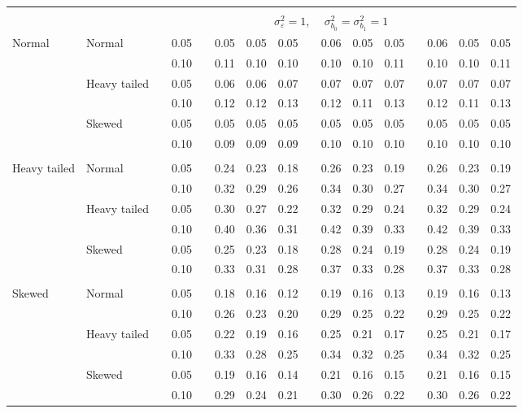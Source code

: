 \documentclass{article} %
\begin{document}
\begin{table}[ht]
\begin{scriptsize}
\begin{center}
\begin{tabular}{ll p{.1cm} c p{.1cm} rrr p{.1cm} rrr p{.1cm} rrr}
&&&&&&&&&&&&&&&\\
& && && \multicolumn{9}{c}{$\sigma_{\varepsilon}^2 = 1$, \ \ $\sigma_{b_0}^2 = \sigma_{b_1}^2 = 1$} \\ \cline{6-16}
\rowcolor{gray!20}Normal       & Normal       && 0.05 &&   0.05 & 0.05 & 0.05 && 0.06 & 0.05 & 0.05 && 0.06 & 0.05 & 0.05 \\ 
\rowcolor{gray!20}             &              && 0.10 &&   0.11 & 0.10 & 0.10 && 0.10 & 0.10 & 0.11 && 0.10 & 0.10 & 0.11 \\ 
\rowcolor{gray!20}             & Heavy tailed && 0.05 &&   0.06 & 0.06 & 0.07 && 0.07 & 0.07 & 0.07 && 0.07 & 0.07 & 0.07 \\ 
\rowcolor{gray!20}             &              && 0.10 &&   0.12 & 0.12 & 0.13 && 0.12 & 0.11 & 0.13 && 0.12 & 0.11 & 0.13 \\ 
\rowcolor{gray!20}             & Skewed       && 0.05 &&   0.05 & 0.05 & 0.05 && 0.05 & 0.05 & 0.05 && 0.05 & 0.05 & 0.05 \\ 
\rowcolor{gray!20}             &              && 0.10 &&   0.09 & 0.09 & 0.09 && 0.10 & 0.10 & 0.10 && 0.10 & 0.10 & 0.10 \\ 
             &&&&&&&&&&&&&&&\\
Heavy tailed & Normal       && 0.05 &&   0.24 & 0.23 & 0.18 && 0.26 & 0.23 & 0.19 && 0.26 & 0.23 & 0.19 \\ 
             &              && 0.10 &&   0.32 & 0.29 & 0.26 && 0.34 & 0.30 & 0.27 && 0.34 & 0.30 & 0.27 \\ 
             & Heavy tailed && 0.05 &&   0.30 & 0.27 & 0.22 && 0.32 & 0.29 & 0.24 && 0.32 & 0.29 & 0.24 \\ 
             &              && 0.10 &&   0.40 & 0.36 & 0.31 && 0.42 & 0.39 & 0.33 && 0.42 & 0.39 & 0.33 \\ 
             & Skewed       && 0.05 &&   0.25 & 0.23 & 0.18 && 0.28 & 0.24 & 0.19 && 0.28 & 0.24 & 0.19 \\ 
             &              && 0.10 &&   0.33 & 0.31 & 0.28 && 0.37 & 0.33 & 0.28 && 0.37 & 0.33 & 0.28 \\ 
             &&&&&&&&&&&&&&&\\
Skewed       & Normal       && 0.05 &&   0.18 & 0.16 & 0.12 && 0.19 & 0.16 & 0.13 && 0.19 & 0.16 & 0.13 \\ 
             &              && 0.10 &&   0.26 & 0.23 & 0.20 && 0.29 & 0.25 & 0.22 && 0.29 & 0.25 & 0.22 \\ 
             & Heavy tailed && 0.05 &&   0.22 & 0.19 & 0.16 && 0.25 & 0.21 & 0.17 && 0.25 & 0.21 & 0.17 \\ 
             &              && 0.10 &&   0.33 & 0.28 & 0.25 && 0.34 & 0.32 & 0.25 && 0.34 & 0.32 & 0.25 \\ 
             & Skewed       && 0.05 &&   0.19 & 0.16 & 0.14 && 0.21 & 0.16 & 0.15 && 0.21 & 0.16 & 0.15 \\ 
             &              && 0.10 &&   0.29 & 0.24 & 0.21 && 0.30 & 0.26 & 0.22 && 0.30 & 0.26 & 0.22 \\ 



\end{tabular}
\end{center}
\end{scriptsize}
\end{table}
\end{document}
